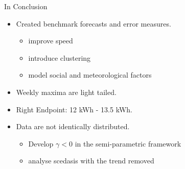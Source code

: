 \documentclass[notes]{beamer}
\begin{document}
\begin{frame}{In Conclusion}
\begin{itemize}
\item Created benchmark forecasts and error measures. \pause \begin{itemize} \item improve speed \item introduce clustering \item model social and meteorological factors \end{itemize} \pause
\item Weekly maxima are light tailed.
\item Right Endpoint: 12 kWh - 13.5 kWh. \pause
\item Data are not identically distributed. \pause \begin{itemize} \item Develop $\gamma <0$ in the semi-parametric framework \item analyse scedasis with the trend removed \end{itemize}
\end{itemize}

\end{frame}
\end{document}
